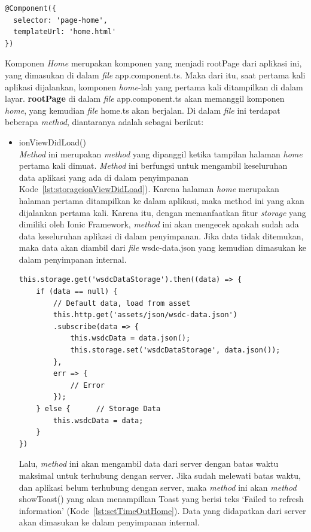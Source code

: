 \begin{itemize}
\begin{lstlisting}[language=html, label={lst:componenthome}, caption=@Component pada home.ts]
@Component({
  selector: 'page-home',
  templateUrl: 'home.html'
})
\end{lstlisting}	
	
	Komponen \textit{Home} merupakan komponen yang menjadi rootPage dari aplikasi ini, yang dimasukan di dalam \textit{file} app.component.ts. Maka dari itu, saat pertama kali aplikasi dijalankan, komponen \textit{home}-lah yang pertama kali ditampilkan di dalam layar. \textbf{rootPage} di dalam \textit{file} app.component.ts akan memanggil komponen \textit{home}, yang kemudian \textit{file} home.ts akan berjalan. Di dalam \textit{file} ini terdapat beberapa \textit{method}, diantaranya adalah sebagai berikut:
	
	\begin{itemize}
		\item ionViewDidLoad() \\
		\textit{Method} ini merupakan \textit{method} yang dipanggil ketika tampilan halaman \textit{home} pertama kali dimuat. \textit{Method} ini berfungsi untuk mengambil keseluruhan data aplikasi yang ada di dalam penyimpanan Kode~\ref{lst:storageionViewDidLoad}). Karena halaman \textit{home} merupakan halaman pertama ditampilkan ke dalam aplikasi, maka method ini yang akan dijalankan pertama kali. Karena itu, dengan memanfaatkan fitur \textit{storage} yang dimiliki oleh Ionic Framework, \textit{method} ini akan mengecek apakah sudah ada data keseluruhan aplikasi di dalam penyimpanan. Jika data tidak ditemukan, maka data akan diambil dari \textit{file} wsdc-data.json yang kemudian dimasukan ke dalam penyimpanan internal.

	\begin{lstlisting}[language=html, label={lst:storageionViewDidLoad}, caption=Storage pada ionViewDidLoad()]
this.storage.get('wsdcDataStorage').then((data) => {
	if (data == null) {
		// Default data, load from asset
		this.http.get('assets/json/wsdc-data.json')
		.subscribe(data => {
			this.wsdcData = data.json();
			this.storage.set('wsdcDataStorage', data.json());
		},
		err => {
			// Error
		});
	} else {      // Storage Data
		this.wsdcData = data;
	}
})
\end{lstlisting}
		Lalu, \textit{method} ini akan mengambil data dari server dengan batas waktu maksimal untuk terhubung dengan server. Jika sudah melewati batas waktu, dan aplikasi belum terhubung dengan server, maka \textit{method} ini akan \textit{method} showToast() yang akan menampilkan Toast yang berisi teks `Failed to refresh information' (Kode~\ref{lst:setTimeOutHome}). Data yang didapatkan dari server akan dimasukan ke dalam penyimpanan internal.


\end{itemize}
\end{itemize}

